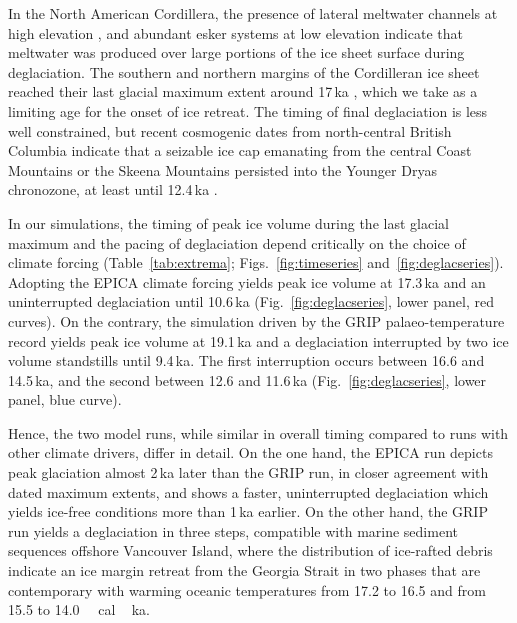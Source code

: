 \documentclass[tc]{copernicus}
\begin{document}
In the North American Cordillera, the presence of lateral meltwater channels
at high elevation \citep{Margold.etal.2011, Margold.etal.2013a,
Margold.etal.2014}, and abundant esker systems at low elevation
\citep{Burke.etal.2012, Burke.etal.2012a, Perkins.etal.2013, Margold.etal.2013}
indicate that meltwater was produced over large portions of the ice sheet
surface during deglaciation. The southern and northern margins of the
Cordilleran ice sheet reached their last glacial maximum extent around
17\,ka \citep[Sect.~\ref{sec:timing};][]{Porter.Swanson.1998, Cosma.etal.2008,
Stroeven.etal.2010, Stroeven.etal.2014}, which we take as a limiting age for
the onset of ice retreat. The timing of final deglaciation is less well
constrained, but recent cosmogenic dates from north-central British Columbia
indicate that a seizable ice cap emanating from the central Coast Mountains or
the Skeena Mountains persisted into the Younger Dryas chronozone, at least
until 12.4\,ka \citep{Margold.etal.2014}.

In our simulations, the timing of peak ice volume during the last glacial
maximum and the pacing of deglaciation depend critically on the choice of
climate forcing (Table~\ref{tab:extrema}; Figs.~\ref{fig:timeseries}
and~\ref{fig:deglacseries}). Adopting the EPICA climate forcing yields peak ice
volume at 17.3\,ka and an uninterrupted deglaciation until 10.6\,ka
(Fig.~\ref{fig:deglacseries}, lower panel, red curves). On the contrary, the
simulation driven by the GRIP palaeo-temperature record yields peak ice volume
at 19.1\,ka and a deglaciation interrupted by two ice volume standstills until
9.4\,ka. The first interruption occurs between 16.6 and 14.5\,ka, and the
second between 12.6 and 11.6\,ka (Fig.~\ref{fig:deglacseries}, lower panel,
blue curve).

Hence, the two model runs, while similar in overall timing compared to runs
with other climate drivers, differ in detail. On the one hand, the EPICA run
depicts peak glaciation almost 2\,ka later than the GRIP run, in closer
agreement with dated maximum extents, and shows a faster, uninterrupted
deglaciation which yields ice-free conditions more than 1\,ka earlier. On the
other hand, the GRIP run yields a deglaciation in three steps, compatible with
marine sediment sequences offshore Vancouver Island, where the distribution of
ice-rafted debris indicate an ice margin retreat from the Georgia Strait in two
phases that are contemporary with warming oceanic temperatures from 17.2 to
16.5 and from 15.5 to 14.0\,\unit{\,cal\,ka}.
\end{document}

